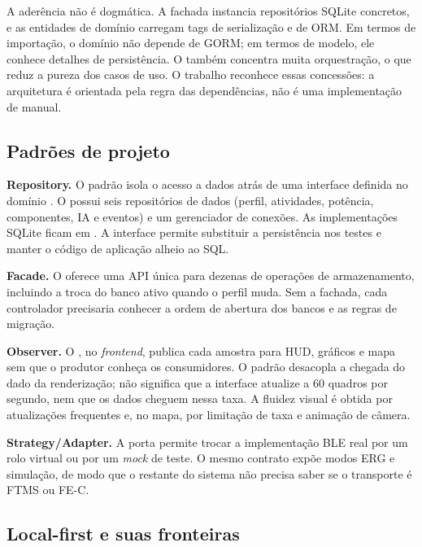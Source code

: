 A aderência não é dogmática. A fachada  instancia
repositórios SQLite concretos, e as entidades de domínio carregam tags de
serialização e de ORM. Em termos de importação, o domínio não depende de GORM;
em termos de modelo, ele conhece detalhes de persistência. O 
também concentra muita orquestração, o que reduz a pureza dos casos de uso. O
trabalho reconhece essas concessões: a arquitetura é orientada pela regra das
dependências, não é uma implementação de manual.

\subsection{Padrões de projeto}
\label{sec:padroes}

\textbf{Repository.} O padrão isola o acesso a dados atrás de uma interface
definida no domínio \cite{gof1995}. O \argus{} possui seis repositórios de
dados (perfil, atividades, potência, componentes, IA e eventos) e um
gerenciador de conexões. As implementações SQLite ficam em
. A interface permite substituir a
persistência nos testes e manter o código de aplicação alheio ao SQL.

\textbf{Facade.} O  oferece uma API única para dezenas de
operações de armazenamento, incluindo a troca do banco ativo quando o perfil
muda. Sem a fachada, cada controlador precisaria conhecer a ordem de abertura
dos bancos e as regras de migração.

\textbf{Observer.} O , no \textit{frontend}, publica
cada amostra para HUD, gráficos e mapa sem que o produtor conheça os
consumidores. O padrão desacopla a chegada do dado da renderização; não
significa que a interface atualize a 60 quadros por segundo, nem que os dados
cheguem nessa taxa. A fluidez visual é obtida por atualizações frequentes e,
no mapa, por limitação de taxa e animação de câmera.

\textbf{Strategy/Adapter.} A porta  permite trocar a
implementação BLE real por um rolo virtual ou por um \textit{mock} de
teste. O mesmo contrato expõe modos ERG e simulação, de modo que o restante do
sistema não precisa saber se o transporte é FTMS ou FE-C.

\subsection{Local-first e suas fronteiras}
\label{sec:local-first}

